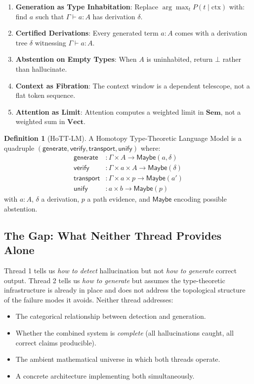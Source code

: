 \documentclass[11pt,a4paper]{article}
\theoremstyle{plain}
\theoremstyle{definition}
\newtheorem{definition}[theorem]{Definition}
\theoremstyle{remark}
\newcommand{\Sem}{\mathbf{Sem}}
\newcommand{\Vect}{\mathbf{Vect}}
\begin{document}
\begin{enumerate}[leftmargin=*,nosep]
\item \textbf{Generation as Type Inhabitation}: Replace $\arg\max_t P(t \mid \text{ctx})$ with: find $a$ such that $\Gamma \vdash a : A$ has derivation $\delta$.
\item \textbf{Certified Derivations}: Every generated term $a : A$ comes with a derivation tree $\delta$ witnessing $\Gamma \vdash a : A$.
\item \textbf{Abstention on Empty Types}: When $A$ is uninhabited, return $\bot$ rather than hallucinate.
\item \textbf{Context as Fibration}: The context window is a dependent telescope, not a flat token sequence.
\item \textbf{Attention as Limit}: Attention computes a weighted limit in $\Sem$, not a weighted sum in $\Vect$.
\end{enumerate}

\begin{definition}[HoTT-LM]\label{def:hottlm-review}
A Homotopy Type-Theoretic Language Model is a quadruple $(\mathsf{generate}, \mathsf{verify}, \mathsf{transport}, \mathsf{unify})$ where:
\begin{align}
\mathsf{generate} &: \Gamma \times A \to \mathsf{Maybe}(a, \delta) \\
\mathsf{verify} &: \Gamma \times a \times A \to \mathsf{Maybe}(\delta) \\
\mathsf{transport} &: \Gamma \times a \times p \to \mathsf{Maybe}(a') \\
\mathsf{unify} &: a \times b \to \mathsf{Maybe}(p)
\end{align}
with $a : A$, $\delta$ a derivation, $p$ a path evidence, and $\mathsf{Maybe}$ encoding possible abstention.
\end{definition}

\subsection{The Gap: What Neither Thread Provides Alone}

Thread 1 tells us \emph{how to detect} hallucination but not \emph{how to generate} correct output. Thread 2 tells us \emph{how to generate} but assumes the type-theoretic infrastructure is already in place and does not address the topological structure of the failure modes it avoids. Neither thread addresses:
\begin{itemize}[nosep]
  \item The categorical relationship between detection and generation.
  \item Whether the combined system is \emph{complete} (all hallucinations caught, all correct claims producible).
  \item The ambient mathematical universe in which both threads operate.
  \item A concrete architecture implementing both simultaneously.
\end{itemize}
\end{document}

